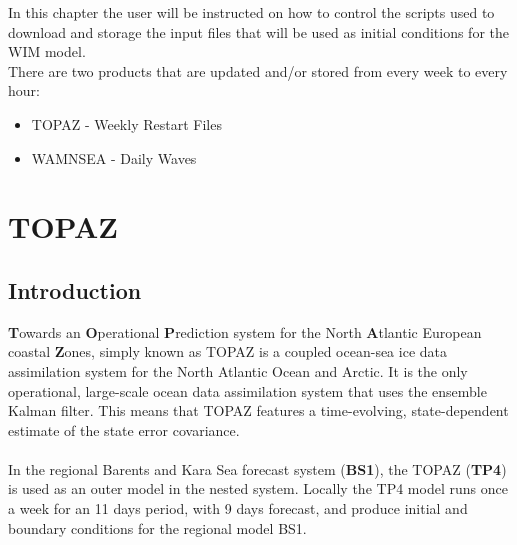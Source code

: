 \documentclass[12pt,a4paper]{report}
\begin{document}
%

In this chapter the user will be instructed on how to control the scripts used to download and storage the input files that will be used as initial conditions for the WIM model.\\
There are two products that are updated and/or stored from every week to every hour:
\begin{itemize}
\item TOPAZ - Weekly Restart Files
\item WAMNSEA - Daily Waves 
\end{itemize}

\section{TOPAZ}
\subsection{Introduction}
\textbf{T}owards an \textbf{O}perational \textbf{P}rediction system for the North \textbf{A}tlantic European coastal \textbf{Z}ones, simply known as TOPAZ is a coupled ocean-sea ice data assimilation system for the North Atlantic Ocean and Arctic. It is the only operational, large-scale ocean data assimilation system that uses the ensemble Kalman filter. This means that TOPAZ features a time-evolving, state-dependent estimate of the state error covariance.
\\ \\
In the regional Barents and Kara Sea forecast system (\textbf{BS1}), the TOPAZ (\textbf{TP4}) is used as an outer model in the nested system. Locally the TP4 model runs once a week for an 11 days period, with 9 days forecast, and produce initial and boundary conditions for the regional model BS1.
\end{document}
